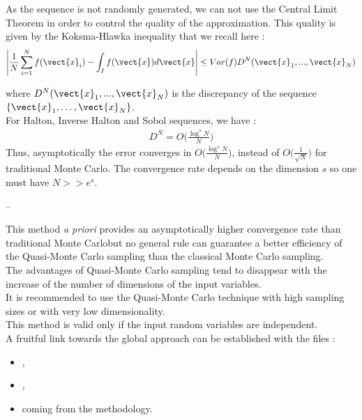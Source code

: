 {  As the sequence is not randomly generated, we can not use the Central Limit Theorem in order to control the quality of the approximation. This quality is given by the  Koksma-Hlawka inequality that we recall here :
  \begin{align*}
    \left\lvert \frac{1}{N}\sum_{i=1}^Nf(\vect{x}_i) - \int_If(\vect{x})d\vect{x} \right\rvert \le Var(f)D^N(\vect{x}_1, ..., \vect{x}_N)
  \end{align*}

  where $D^N(\vect{x}_1, ..., \vect{x}_N)$ is the discrepancy of the sequence $\{\vect{x}_1, \hdots, \vect{x}_N\}$.\\

  For Halton, Inverse Halton and Sobol sequences, we have :
  \begin{align*}
    D^N = O\biggl(\frac{\log^s{N}}{N}\biggr)
  \end{align*}
  Thus, asymptotically the error converges in $O\biggl(\frac{\log^s{N}}{N}\biggr)$, instead of $O\biggl(\frac{1}{\sqrt{N}}\biggr)$ for traditional Monte Carlo. The convergence rate depends on the dimension $s$ so one must have $N >> e^s$.
}
{
  --
}

            {This method \textit{a priori} provides an asymptotically higher convergence rate than traditional Monte Carlobut no general rule can guarantee a better efficiency of the Quasi-Monte Carlo sampling than the classical Monte Carlo sampling.\\
              The advantages of Quasi-Monte Carlo sampling tend to disappear with the increase of the number of dimensions of the input variables. \\
              It is recommended to use the Quasi-Monte Carlo technique with high sampling sizes or with very low dimensionality.\\
              This method is valid only if the input random variables are independent.\\
              A fruitful link towards the global approach can be established with the files :
              \begin{itemize}
              \item {},
              \item   {},
              \item  {} coming from the methodology.
              \end{itemize}
            }
